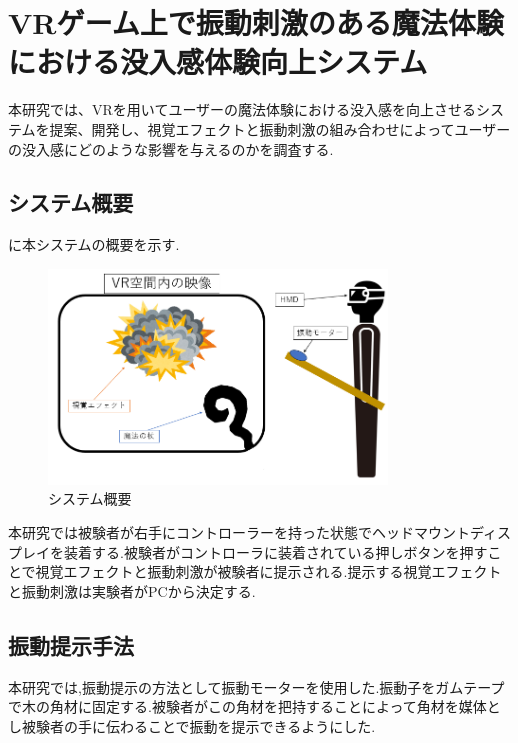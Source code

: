 \chapter{VRゲーム上で振動刺激のある魔法体験における没入感体験向上システム}
本研究では、VRを用いてユーザーの魔法体験における没入感を向上させるシステムを提案、開発し、視覚エフェクトと振動刺激の組み合わせによってユーザーの没入感にどのような影響を与えるのかを調査する.

\section{システム概要}
に本システムの概要を示す.
\begin{figure}[h]
\centering
\includegraphics[clip,width=9cm]{./fig/allsystem.png}
\caption{システム概要}\label{allsystem}
\end{figure}

本研究では被験者が右手にコントローラーを持った状態でヘッドマウントディスプレイを装着する.被験者がコントローラに装着されている押しボタンを押すことで視覚エフェクトと振動刺激が被験者に提示される.提示する視覚エフェクトと振動刺激は実験者がPCから決定する.

\section{振動提示手法}
本研究では,振動提示の方法として振動モーターを使用した.振動子をガムテープで木の角材に固定する.被験者がこの角材を把持することによって角材を媒体とし被験者の手に伝わることで振動を提示できるようにした.


